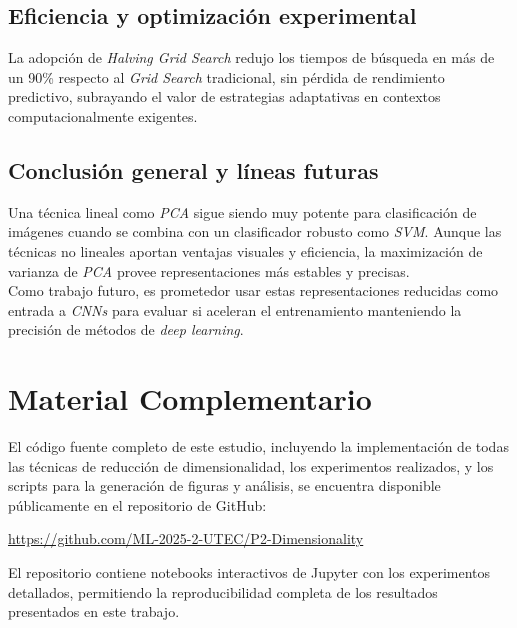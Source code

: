 \documentclass[conference]{IEEEtran}
\begin{document}
\subsection{Eficiencia y optimización experimental}

La adopción de \textit{Halving Grid Search} redujo los tiempos de búsqueda en más de un 90\% respecto al \textit{Grid Search} tradicional, sin pérdida de rendimiento predictivo, subrayando el valor de estrategias adaptativas en contextos computacionalmente exigentes.\\

\subsection{Conclusión general y líneas futuras}

Una técnica lineal como \textit{PCA} sigue siendo muy potente para clasificación de imágenes cuando se combina con un clasificador robusto como \textit{SVM}. Aunque las técnicas no lineales aportan ventajas visuales y eficiencia, la maximización de varianza de \textit{PCA} provee representaciones más estables y precisas.\\

Como trabajo futuro, es prometedor usar estas representaciones reducidas como entrada a \textit{CNNs} para evaluar si aceleran el entrenamiento manteniendo la precisión de métodos de \textit{deep learning}.\\

\section{Material Complementario}

El código fuente completo de este estudio, incluyendo la implementación de todas las técnicas de reducción de dimensionalidad, los experimentos realizados, y los scripts para la generación de figuras y análisis, se encuentra disponible públicamente en el repositorio de GitHub:

\begin{center}
\url{https://github.com/ML-2025-2-UTEC/P2-Dimensionality}
\end{center}

El repositorio contiene notebooks interactivos de Jupyter con los experimentos detallados, permitiendo la reproducibilidad completa de los resultados presentados en este trabajo.



\end{document}

